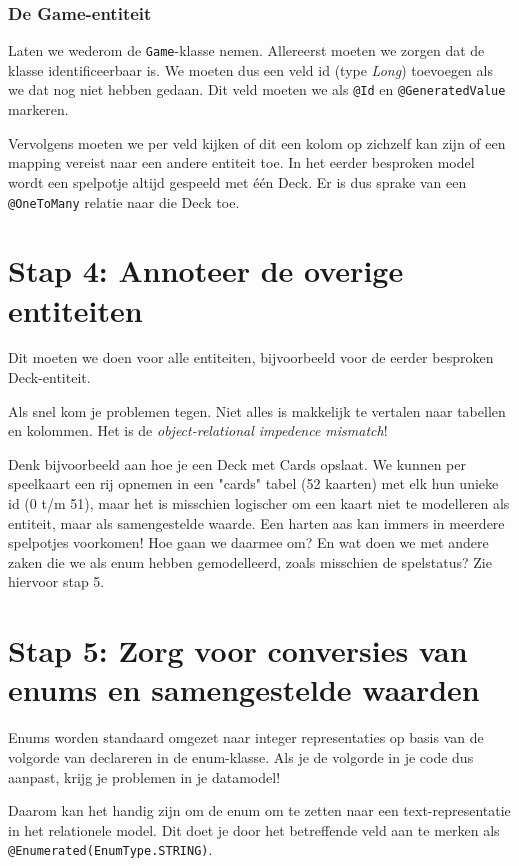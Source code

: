 \documentclass[dutch,a4paper,12pt,doubleside]{book}
\begin{document}
\subsubsection{De Game-entiteit}
Laten we wederom de \texttt{Game}-klasse nemen. Allereerst moeten 
we zorgen dat de klasse identificeerbaar is. We moeten dus een 
veld id (type \textit{Long}) toevoegen als we dat nog niet hebben gedaan.
Dit veld moeten we als \texttt{@Id} en \texttt{@GeneratedValue} markeren.

Vervolgens moeten we per veld kijken of dit een kolom op zichzelf kan zijn 
of een mapping vereist naar een andere entiteit toe. In het eerder besproken model 
wordt een spelpotje altijd gespeeld met één Deck. Er is dus sprake van een 
\texttt{@OneToMany} relatie naar die Deck toe.

\section{Stap 4: Annoteer de overige entiteiten}
Dit moeten we doen voor alle entiteiten, bijvoorbeeld voor de 
eerder besproken Deck-entiteit. 

Als snel kom je problemen tegen. Niet alles is makkelijk te vertalen naar 
tabellen en kolommen. Het is de \textit{object-relational impedence mismatch}!

Denk bijvoorbeeld aan hoe je een Deck met Cards opslaat.
We kunnen per speelkaart 
een rij opnemen in een "cards" tabel (52 kaarten) 
met elk hun unieke id (0 t/m 51), maar het is misschien logischer 
om een kaart niet te modelleren als entiteit, maar als samengestelde waarde.
Een harten aas kan immers in meerdere spelpotjes voorkomen!
Hoe gaan we daarmee om? En wat doen we met andere zaken die 
we als enum hebben gemodelleerd, zoals misschien de spelstatus?
Zie hiervoor stap 5.

\section{Stap 5: Zorg voor conversies van enums en samengestelde waarden}
Enums worden standaard omgezet naar integer representaties
op basis van de volgorde van declareren in de enum-klasse.
Als je de volgorde in je code dus aanpast, krijg je problemen 
in je datamodel!

Daarom kan het handig zijn om de enum om te zetten naar een 
text-representatie in het relationele model. Dit doet je 
door het betreffende veld aan te merken als \texttt{@Enumerated(EnumType.STRING)}. 
\end{document}
